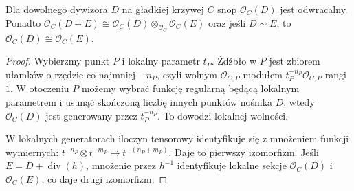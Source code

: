 \begin{twierdzenie}
\label{tw:O-D-invertible}
Dla dowolnego dywizora $D$ na gładkiej krzywej $C$
snop $\mathcal O_C(D)$ jest odwracalny.
Ponadto $\mathcal O_C(D+E)\cong
\mathcal O_C(D)\otimes_{\mathcal O_C}\mathcal O_C(E)$
oraz jeśli $D\sim E$, to
$\mathcal O_C(D)\cong\mathcal O_C(E)$.
\end{twierdzenie}
\begin{proof}
Wybierzmy punkt $P$ i lokalny parametr $t_P$.
Źdźbło w $P$ jest zbiorem ułamków o rzędzie
co najmniej $-n_P$, czyli wolnym
$\mathcal O_{C,P}$-modułem $t_P^{-n_P}\mathcal O_{C,P}$
rangi $1$. W otoczeniu $P$ możemy wybrać
funkcję regularną będącą lokalnym parametrem
i usunąć skończoną liczbę innych punktów nośnika
$D$; wtedy $\mathcal O_C(D)$ jest generowany
przez $t_P^{-n_P}$. To dowodzi lokalnej wolności.

W lokalnych generatorach iloczyn tensorowy
identyfikuje się z mnożeniem funkcji wymiernych:
$t^{-n_P}\otimes t^{-m_P}\mapsto t^{-(n_P+m_P)}$.
Daje to pierwszy izomorfizm. Jeśli
$E=D+\operatorname{div}(h)$, mnożenie przez
$h^{-1}$ identyfikuje lokalne sekcje
$\mathcal O_C(D)$ i $\mathcal O_C(E)$,
co daje drugi izomorfizm.
\end{proof}


